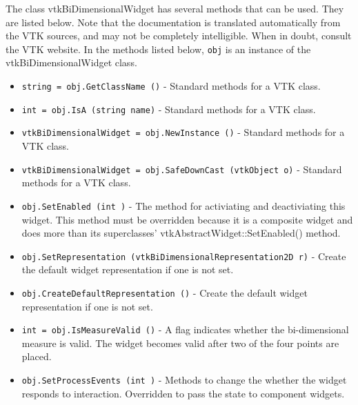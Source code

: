 The class vtkBiDimensionalWidget has several methods that can be used.
  They are listed below.
Note that the documentation is translated automatically from the VTK sources,
and may not be completely intelligible.  When in doubt, consult the VTK website.
In the methods listed below, \verb|obj| is an instance of the vtkBiDimensionalWidget class.
\begin{itemize}
\item  \verb|string = obj.GetClassName ()| -  Standard methods for a VTK class.

\item  \verb|int = obj.IsA (string name)| -  Standard methods for a VTK class.

\item  \verb|vtkBiDimensionalWidget = obj.NewInstance ()| -  Standard methods for a VTK class.

\item  \verb|vtkBiDimensionalWidget = obj.SafeDownCast (vtkObject o)| -  Standard methods for a VTK class.

\item  \verb|obj.SetEnabled (int )| -  The method for activiating and deactiviating this widget. This method
 must be overridden because it is a composite widget and does more than
 its superclasses' vtkAbstractWidget::SetEnabled() method.

\item  \verb|obj.SetRepresentation (vtkBiDimensionalRepresentation2D r)| -  Create the default widget representation if one is not set. 

\item  \verb|obj.CreateDefaultRepresentation ()| -  Create the default widget representation if one is not set. 

\item  \verb|int = obj.IsMeasureValid ()| -  A flag indicates whether the bi-dimensional measure is valid. The widget
 becomes valid after two of the four points are placed.

\item  \verb|obj.SetProcessEvents (int )| -  Methods to change the whether the widget responds to interaction.
 Overridden to pass the state to component widgets.

\end{itemize}
